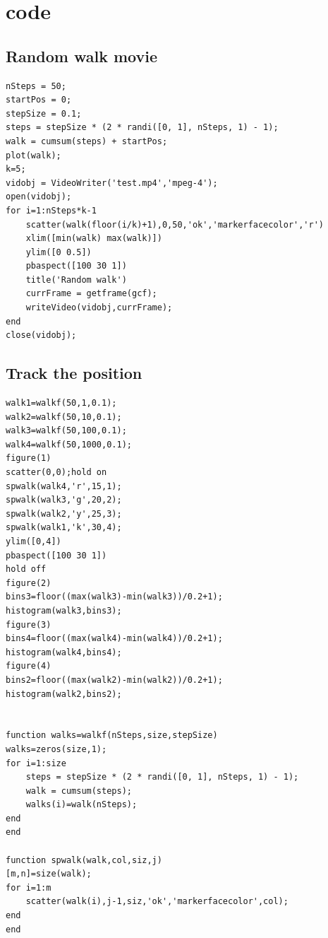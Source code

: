 \documentclass{article}
\begin{document}
\section{code}
\subsection{Random walk movie}
\begin{lstlisting}
nSteps = 50;
startPos = 0;
stepSize = 0.1;
steps = stepSize * (2 * randi([0, 1], nSteps, 1) - 1);
walk = cumsum(steps) + startPos;
plot(walk);
k=5;
vidobj = VideoWriter('test.mp4','mpeg-4');
open(vidobj);
for i=1:nSteps*k-1
    scatter(walk(floor(i/k)+1),0,50,'ok','markerfacecolor','r')
    xlim([min(walk) max(walk)])
    ylim([0 0.5])
    pbaspect([100 30 1])
    title('Random walk')
    currFrame = getframe(gcf);
    writeVideo(vidobj,currFrame);
end
close(vidobj);
\end{lstlisting}


\subsection{Track the position}
\begin{lstlisting}
walk1=walkf(50,1,0.1);
walk2=walkf(50,10,0.1);
walk3=walkf(50,100,0.1);
walk4=walkf(50,1000,0.1);
figure(1)
scatter(0,0);hold on
spwalk(walk4,'r',15,1);
spwalk(walk3,'g',20,2);
spwalk(walk2,'y',25,3);
spwalk(walk1,'k',30,4);
ylim([0,4])
pbaspect([100 30 1])
hold off
figure(2)
bins3=floor((max(walk3)-min(walk3))/0.2+1);
histogram(walk3,bins3);
figure(3)
bins4=floor((max(walk4)-min(walk4))/0.2+1);
histogram(walk4,bins4);
figure(4)
bins2=floor((max(walk2)-min(walk2))/0.2+1);
histogram(walk2,bins2);


function walks=walkf(nSteps,size,stepSize)
walks=zeros(size,1);
for i=1:size
    steps = stepSize * (2 * randi([0, 1], nSteps, 1) - 1);
    walk = cumsum(steps);
    walks(i)=walk(nSteps);
end
end

function spwalk(walk,col,siz,j)
[m,n]=size(walk);
for i=1:m
    scatter(walk(i),j-1,siz,'ok','markerfacecolor',col);
end
end
\end{lstlisting}
\end{document}
